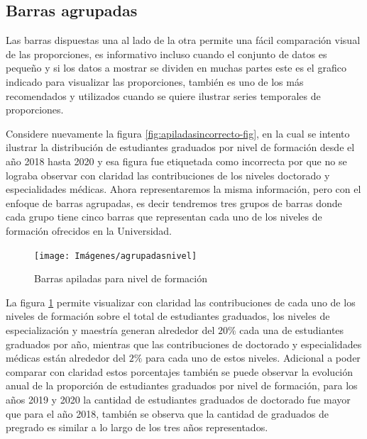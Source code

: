 \documentclass[
]{book}
\begin{document}
\hypertarget{barras-agrupadas}{%
\subsection{Barras agrupadas}\label{barras-agrupadas}}

Las barras dispuestas una al lado de la otra permite una fácil comparación visual de las proporciones, es informativo incluso cuando el conjunto de datos es pequeño y si los datos a mostrar se dividen en muchas partes este es el grafico indicado para visualizar las proporciones, también es uno de los más recomendados y utilizados cuando se quiere ilustrar series temporales de proporciones.

Considere nuevamente la figura \ref{fig:apiladasincorrecto-fig}, en la cual se intento ilustrar la distribución de estudiantes graduados por nivel de formación desde el año 2018 hasta 2020 y esa figura fue etiquetada como incorrecta por que no se lograba observar con claridad las contribuciones de los niveles doctorado y especialidades médicas. Ahora representaremos la misma información, pero con el enfoque de barras agrupadas, es decir tendremos tres grupos de barras donde cada grupo tiene cinco barras que representan cada uno de los niveles de formación ofrecidos en la Universidad.

\begin{figure}

{\centering \texttt{[image: Imágenes/agrupadasnivel]} 

}

\caption{Barras apiladas para nivel de formación}\label{fig:agrupadasnivel-fig}
\end{figure}

La figura \ref{fig:agrupadasnivel-fig} permite visualizar con claridad las contribuciones de cada uno de los niveles de formación sobre el total de estudiantes graduados, los niveles de especialización y maestría generan alrededor del \(20\%\) cada una de estudiantes graduados por año, mientras que las contribuciones de doctorado y especialidades médicas están alrededor del \(2\%\) para cada uno de estos niveles. Adicional a poder comparar con claridad estos porcentajes también se puede observar la evolución anual de la proporción de estudiantes graduados por nivel de formación, para los años 2019 y 2020 la cantidad de estudiantes graduados de doctorado fue mayor que para el año 2018, también se observa que la cantidad de graduados de pregrado es similar a lo largo de los tres años representados.
\end{document}
